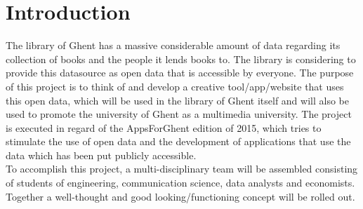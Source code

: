 \chapter{Introduction}

The library of Ghent has a massive considerable amount of data regarding its collection of books and the people it lends books to. The library is considering to provide this datasource as open data that is accessible by everyone. The purpose of this project is to think of and develop a creative tool/app/website that uses this open data, which will be used in the library of Ghent itself and will also be used to promote the university of Ghent as a multimedia university. The project is executed in regard of the AppsForGhent edition of 2015, which tries to stimulate the use of open data and the development of applications that use the data which has been put publicly accessible.\\
To accomplish this project, a multi-disciplinary team will be assembled consisting of students of engineering, communication science, data analysts and economists. Together a well-thought and good looking/functioning concept will be rolled out.